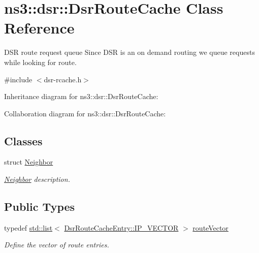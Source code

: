 \hypertarget{classns3_1_1dsr_1_1DsrRouteCache}{}\section{ns3\+:\+:dsr\+:\+:Dsr\+Route\+Cache Class Reference}
\label{classns3_1_1dsr_1_1DsrRouteCache}


D\+SR route request queue Since D\+SR is an on demand routing we queue requests while looking for route.  




{\ttfamily \#include $<$dsr-\/rcache.\+h$>$}



Inheritance diagram for ns3\+:\+:dsr\+:\+:Dsr\+Route\+Cache\+:


Collaboration diagram for ns3\+:\+:dsr\+:\+:Dsr\+Route\+Cache\+:
\subsection*{Classes}
\begin{DoxyCompactItemize}
\item 
struct \hyperlink{structns3_1_1dsr_1_1DsrRouteCache_1_1Neighbor}{Neighbor}
\begin{DoxyCompactList}\small\item\em \hyperlink{structns3_1_1dsr_1_1DsrRouteCache_1_1Neighbor}{Neighbor} description. \end{DoxyCompactList}\end{DoxyCompactItemize}
\subsection*{Public Types}
\begin{DoxyCompactItemize}
\item 
typedef \hyperlink{openflow-interface_8h_afd9bcfa176617760671b67580f536fa7}{std\+::list}$<$ \hyperlink{classns3_1_1dsr_1_1DsrRouteCacheEntry_ab834177006bdbfd2e3fa607c2a88cbdf}{Dsr\+Route\+Cache\+Entry\+::\+I\+P\+\_\+\+V\+E\+C\+T\+OR} $>$ \hyperlink{classns3_1_1dsr_1_1DsrRouteCache_a055f612eb8c2e05b634db24523adb1e5}{route\+Vector}
\begin{DoxyCompactList}\small\item\em Define the vector of route entries. \end{DoxyCompactList}\end{DoxyCompactItemize}
